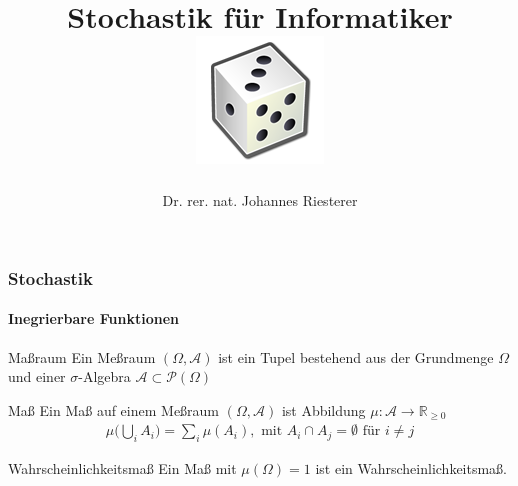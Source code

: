 \documentclass{beamer}
\begin{document}
\title[Stochastik] %
{Stochastik für Informatiker
\\
\includegraphics[scale=0.5]{img/craps}
}
\subtitle{}
\author[Dr. Johannes Riesterer] %
{Dr.  rer. nat. Johannes Riesterer}

\date[KPT 2004] %
{}

\subject{Stochastik}


\begin{frame}
    \frametitle{Stochastik}
\framesubtitle{Inegrierbare Funktionen}
    \begin{block}{Maßraum}
     Ein Meßraum $(\Omega, \mathcal{A})$ ist ein Tupel bestehend aus der Grundmenge $\Omega$ und einer $\sigma$-Algebra $\mathcal{A} \subset  \mathcal{P}(\Omega)$ 
\end{block}

\begin{block}{Maß}
    Ein Maß auf einem Meßraum $(\Omega, \mathcal{A})$ ist Abbildung
    $\mu : \mathcal{A} \to \mathbb{R}_{\geq 0}$
    \begin{align*}
    \mu \biggl(  \bigcup_i A_i  \biggr) = \sum_i \mu(A_i), \text{ mit } A_i \cap A_j = \emptyset \text{ für } i \neq j
    \end{align*}
    \end{block}
    
    \begin{block}{Wahrscheinlichkeitsmaß}
     Ein Maß mit $\mu (\Omega) = 1$ ist ein Wahrscheinlichkeitsmaß.
   \end{block}

 \end{frame}
\end{document}
